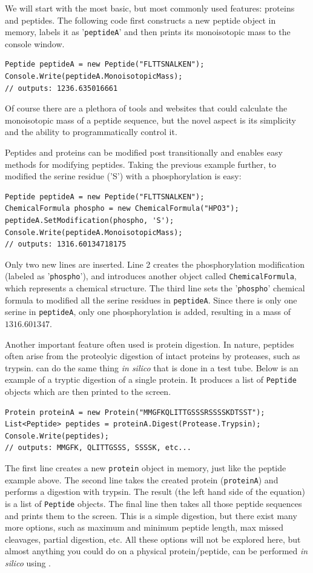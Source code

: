 We will start with the most basic, but most commonly used features: proteins and peptides. The following code first constructs a new peptide object in memory, labels it as '\texttt{peptideA}' and then prints its monoisotopic mass to the console window.
\begin{lstlisting}
Peptide peptideA = new Peptide("FLTTSNALKEN");
Console.Write(peptideA.MonoisotopicMass);
// outputs: 1236.635016661
\end{lstlisting}
Of course there are a plethora of tools and websites that could calculate the monoisotopic mass of a peptide sequence, but the novel aspect is its simplicity and the ability to programmatically control it.

Peptides and proteins can be modified post transitionally and \csmsl{} enables easy methods for modifying peptides. Taking the previous example further, to modified the serine residue ('S') with a phosphorylation is easy:
\begin{lstlisting}
Peptide peptideA = new Peptide("FLTTSNALKEN");
ChemicalFormula phospho = new ChemicalFormula("HPO3");
peptideA.SetModification(phospho, 'S');
Console.Write(peptideA.MonoisotopicMass);
// outputs: 1316.60134718175
\end{lstlisting}
Only two new lines are inserted. Line 2 creates the phosphorylation modification (labeled as '\texttt{phospho}'), and introduces another \csmsl{} object called \texttt{ChemicalFormula}, which represents a chemical structure. The third line sets the '\texttt{phospho}' chemical formula to modified all the serine residues in \texttt{peptideA}. Since there is only one serine in \texttt{peptideA}, only one phosphorylation is added, resulting in a mass of $1316.601347$.

Another important feature often used is protein digestion. In nature, peptides often arise from the proteolyic digestion of intact proteins by proteases, such as trypsin. \csmsl{} can do the same thing \emph{in silico} that is done in a test tube. Below is an example of a tryptic digestion of a single protein. It produces a list of \texttt{Peptide} objects which are then printed to the screen.
\begin{lstlisting}
Protein proteinA = new Protein("MMGFKQLITTGSSSRSSSSKDTSST");
List<Peptide> peptides = proteinA.Digest(Protease.Trypsin);
Console.Write(peptides);
// outputs: MMGFK, QLITTGSSS, SSSSK, etc...
\end{lstlisting}
The first line creates a new \texttt{protein} object in memory, just like the peptide example above. The second line takes the created protein (\texttt{proteinA}) and performs a digestion with trypsin. The result (the left hand side of the equation) is a list of \texttt{Peptide} objects. The final line then takes all those peptide sequences and prints them to the screen. This is a simple digestion, but there exist many more options, such as maximum and minimum peptide length, max missed cleavages, partial digestion, etc. All these options will not be explored here, but almost anything you could do on a physical protein/peptide, can be performed \emph{in silico} using \csmsl{}.

